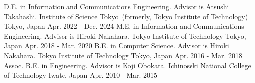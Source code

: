 \begin{cventries}
  \eduentry
    {D.E. in Information and Communications Engineering. Advisor is Atsushi Takahashi.} %
    {Institute of Science Tokyo~(formerly, Tokyo Institute of Technology)} %
    {Tokyo, Japan} %
    {Apr. 2022 - Dec. 2024} %
  \eduentry
    {M.E. in Information and Communications Engineering. Advisor is Hiroki Nakahara.} %
    {Tokyo Institute of Technology} %
    {Tokyo, Japan} %
    {Apr. 2018 - Mar. 2020} %
  \eduentry
    {B.E. in Computer Science. Advisor is Hiroki Nakahara.} %
    {Tokyo Institute of Technology} %
    {Tokyo, Japan} %
    {Apr. 2016 - Mar. 2018} %
  \eduentry
    {Assoc. B.E. in Engineering. Advisor is Koji Obokata.} %
    {Ichinoseki National College of Technology} %
    {Iwate, Japan} %
    {Apr. 2010 - Mar. 2015} %
\end{cventries}
